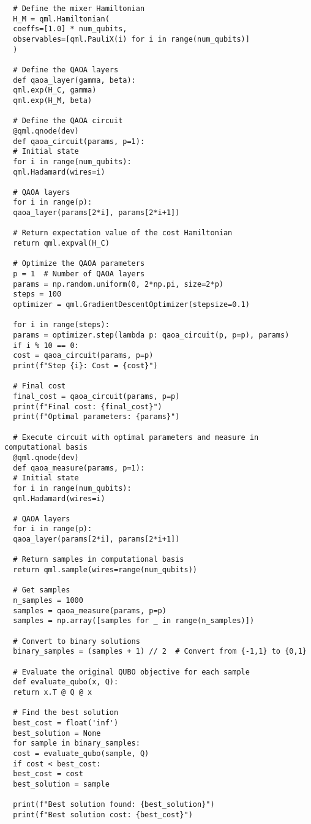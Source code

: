 \begin{verbatim}
  # Define the mixer Hamiltonian
  H_M = qml.Hamiltonian(
  coeffs=[1.0] * num_qubits,
  observables=[qml.PauliX(i) for i in range(num_qubits)]
  )

  # Define the QAOA layers
  def qaoa_layer(gamma, beta):
  qml.exp(H_C, gamma)
  qml.exp(H_M, beta)

  # Define the QAOA circuit
  @qml.qnode(dev)
  def qaoa_circuit(params, p=1):
  # Initial state
  for i in range(num_qubits):
  qml.Hadamard(wires=i)

  # QAOA layers
  for i in range(p):
  qaoa_layer(params[2*i], params[2*i+1])

  # Return expectation value of the cost Hamiltonian
  return qml.expval(H_C)

  # Optimize the QAOA parameters
  p = 1  # Number of QAOA layers
  params = np.random.uniform(0, 2*np.pi, size=2*p)
  steps = 100
  optimizer = qml.GradientDescentOptimizer(stepsize=0.1)

  for i in range(steps):
  params = optimizer.step(lambda p: qaoa_circuit(p, p=p), params)
  if i % 10 == 0:
  cost = qaoa_circuit(params, p=p)
  print(f"Step {i}: Cost = {cost}")

  # Final cost
  final_cost = qaoa_circuit(params, p=p)
  print(f"Final cost: {final_cost}")
  print(f"Optimal parameters: {params}")

  # Execute circuit with optimal parameters and measure in computational basis
  @qml.qnode(dev)
  def qaoa_measure(params, p=1):
  # Initial state
  for i in range(num_qubits):
  qml.Hadamard(wires=i)

  # QAOA layers
  for i in range(p):
  qaoa_layer(params[2*i], params[2*i+1])

  # Return samples in computational basis
  return qml.sample(wires=range(num_qubits))

  # Get samples
  n_samples = 1000
  samples = qaoa_measure(params, p=p)
  samples = np.array([samples for _ in range(n_samples)])

  # Convert to binary solutions
  binary_samples = (samples + 1) // 2  # Convert from {-1,1} to {0,1}

  # Evaluate the original QUBO objective for each sample
  def evaluate_qubo(x, Q):
  return x.T @ Q @ x

  # Find the best solution
  best_cost = float('inf')
  best_solution = None
  for sample in binary_samples:
  cost = evaluate_qubo(sample, Q)
  if cost < best_cost:
  best_cost = cost
  best_solution = sample

  print(f"Best solution found: {best_solution}")
  print(f"Best solution cost: {best_cost}")
\end{verbatim}

